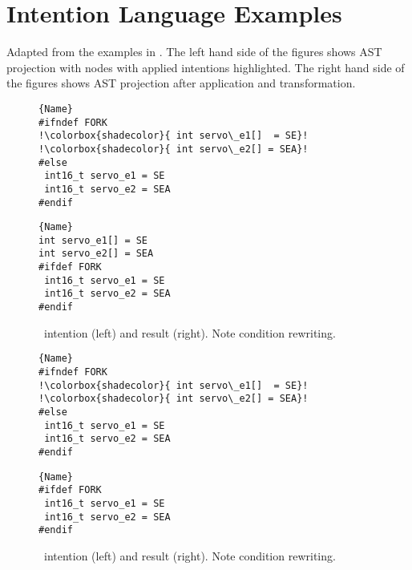 \chapter{Intention Language Examples}\label{a:intentions}
Adapted from the examples in \cite{lillack2017intentions}. The left hand side of the figures shows AST projection with nodes with applied intentions \colorbox{shadecolor}{highlighted}. The right hand side of the figures shows AST projection after application and transformation.

\begin{figure}[ht]
    \centering
    \begin{minipage}{.35\textwidth}
\begin{lstlisting}[caption=Wrapped code by PC,escapechar=!]{Name}
#ifndef FORK
!\colorbox{shadecolor}{ int servo\_e1[]  = SE}!
!\colorbox{shadecolor}{ int servo\_e2[] = SEA}!
#else
 int16_t servo_e1 = SE
 int16_t servo_e2 = SEA
#endif
\end{lstlisting}
\end{minipage}\qquad
\begin{minipage}{.35\textwidth}
\begin{lstlisting}[caption=Unwrapped code,escapechar=!]{Name}
int servo_e1[] = SE
int servo_e2[] = SEA
#ifdef FORK
 int16_t servo_e1 = SE
 int16_t servo_e2 = SEA
#endif
\end{lstlisting}
    \end{minipage}
    \caption{\keep~intention (left) and result (right). Note condition rewriting.}
    \label{fig:keep}
\end{figure}

\begin{figure}[ht]
    \centering
    \begin{minipage}{.35\textwidth}
\begin{lstlisting}[caption=Wrapped code by PC,escapechar=!]{Name}
#ifndef FORK
!\colorbox{shadecolor}{ int servo\_e1[]  = SE}!
!\colorbox{shadecolor}{ int servo\_e2[] = SEA}!
#else
 int16_t servo_e1 = SE
 int16_t servo_e2 = SEA
#endif
\end{lstlisting}
\end{minipage}\qquad
\begin{minipage}{.35\textwidth}
\begin{lstlisting}[caption=Unwrapped code,escapechar=!]{Name}
#ifdef FORK
 int16_t servo_e1 = SE
 int16_t servo_e2 = SEA
#endif
\end{lstlisting}
    \end{minipage}
    \caption{\remove~intention (left) and result (right). Note condition rewriting.}
    \label{fig:remove}
\end{figure}

